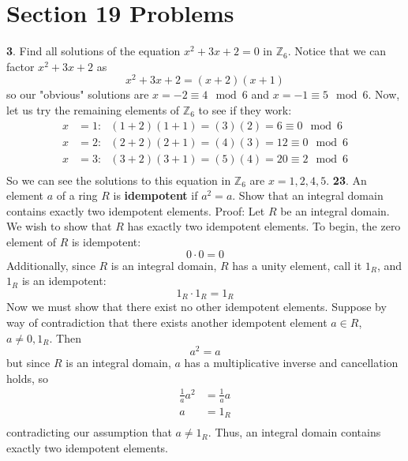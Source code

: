 \documentclass{article}
\begin{document}
\section*{Section 19 Problems}
\textbf{3}. Find all solutions of the equation $x^2 + 3x + 2 = 0$ in $\mathbb{Z}_6$.
\newline\newline
Notice that we can factor $x^2 + 3x + 2$ as
\[x^2 + 3x + 2 = (x+2)(x+1)\]
so our "obvious" solutions are $x = -2 \equiv 4 \mod{6}$ and $x = -1 \equiv 5 \mod{6}$. Now, let us try the remaining elements of $\mathbb{Z}_6$ to see if they work:
\begin{align*}
    x&=1: \:\:\: (1+2)(1+1) = (3)(2) = 6 \equiv 0 \mod{6} \\
    x&=2: \:\:\: (2+2)(2+1) = (4)(3) = 12 \equiv 0 \mod{6} \\
    x&=3: \:\:\: (3+2)(3+1) = (5)(4) = 20 \equiv 2 \mod{6} \\
\end{align*}
So we can see the solutions to this equation in $\mathbb{Z}_6$ are $x = 1,2,4,5$.
\newline\newline
\textbf{23}. An element $a$ of a ring $R$ is \textbf{idempotent} if $a^2 = a$. Show that an integral domain contains exactly two idempotent elements.
\newline\newline
Proof: Let $R$ be an integral domain. We wish to show that $R$ has exactly two idempotent elements. To begin, the zero element of $R$ is idempotent:
\[0\cdot 0 = 0\]
Additionally, since $R$ is an integral domain, $R$ has a unity element, call it $1_R$, and $1_R$ is an idempotent:
\[1_R \cdot 1_R = 1_R\]
Now we must show that there exist no other idempotent elements. Suppose by way of contradiction that there exists another idempotent element $a \in R$, $a \neq 0, 1_R$. Then 
\[a^2 = a\]
but since $R$ is an integral domain, $a$ has a multiplicative inverse and cancellation holds, so 
\begin{align*}
    \frac{1}{a}a^2 &= \frac{1}{a}a \\
    a &= 1_R \\
\end{align*}
contradicting our assumption that $a \neq 1_R$. Thus, an integral domain contains exactly two idempotent elements.
\end{document}
